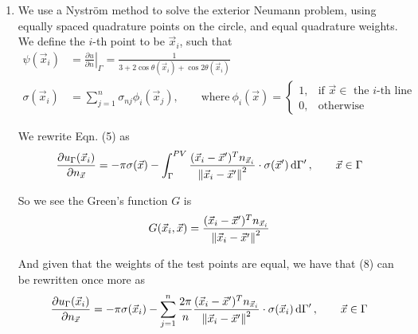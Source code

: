 \begin{enumerate}[label=(\alph*),leftmargin=*,itemsep=0mm]
    
    \item We use a Nyström method to solve the exterior Neumann problem, using equally spaced quadrature points on the circle, and equal quadrature weights.  We define the $i$-th point to be $\vec{x}_i$, such that
    \begin{align}
        \psi(\vec{x}_i) &= \left. \frac{\partial{u}}{\partial{n}} \right|_\Gamma
        = \frac{1}{3+2\cos\theta(\vec{x}_i) +\cos2\theta(\vec{x}_i)} \\
        \sigma(\vec{x}_i) &= \sum_{j=1}^n \sigma_{nj} \phi_i(\vec{x}_j), \qquad
        \text{where}\>\phi_i(\vec{x}) =
        \begin{cases}
            1, & \text{if $\vec{x} \in$ the $i$-th line} \\
            0, & \text{otherwise}
        \end{cases}
    \end{align}
    
    We rewrite Eqn. (5) as
    \begin{align}
        \frac{\partial{u}_\Gamma (\vec{x}_i)}{\partial{n}_{\vec{x}}}
        = -\pi\sigma(\vec{x}) - \int_\Gamma^{PV}
        \frac{(\vec{x}_i-\vec{x}')^Tn_{\vec{x}_i}}{\norm{\vec{x}_i-\vec{x}'}^2}\cdot \sigma(\vec{x}') \dd{\Gamma'},
        \qquad \vec{x}\in\Gamma
    \end{align}
    
    So we see the Green's function $G$ is
    \begin{align}
        G(\vec{x}_i,\vec{x}) = \frac{(\vec{x}_i-\vec{x}')^Tn_{\vec{x}_i}}{\norm{\vec{x}_i-\vec{x}'}^2}
    \end{align}
    
    And given that the weights of the test points are equal, we have that (8) can be rewritten once more as
    \begin{align}
        \frac{\partial{u}_\Gamma (\vec{x}_i)}{\partial{n}_{\vec{x}}}
        = -\pi\sigma(\vec{x}_i) - \sum_{j=1}^n \frac{2\pi}{n}
        \frac{(\vec{x}_i-\vec{x}')^Tn_{\vec{x}_i}}{\norm{\vec{x}_i-\vec{x}'}^2}\cdot \sigma(\vec{x}_i) \dd{\Gamma'},
        \qquad \vec{x}\in\Gamma
    \end{align}
    

\end{enumerate}
